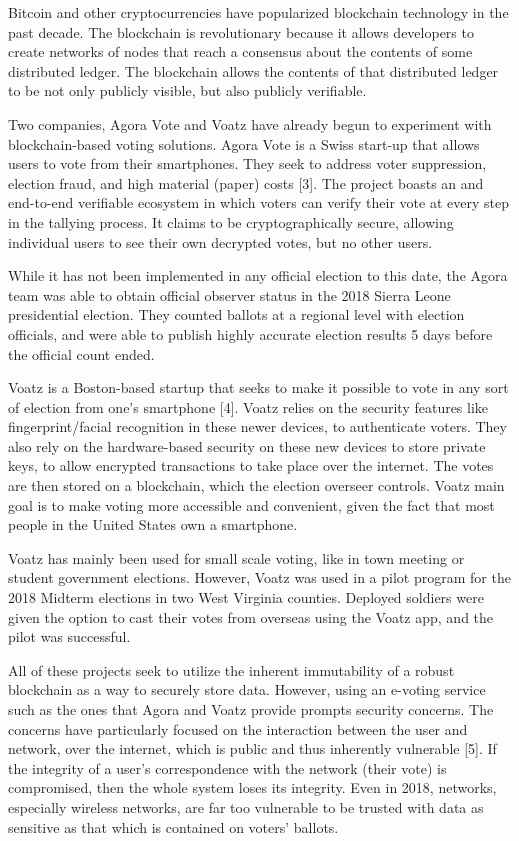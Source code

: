 \documentclass[conference]{IEEEtran}
\begin{document}
Bitcoin and other cryptocurrencies have popularized blockchain technology in the past decade. The blockchain is revolutionary because it allows developers to create networks of nodes that reach a consensus about the contents of some distributed ledger. The blockchain allows the contents of that distributed ledger to be not only publicly visible, but also publicly verifiable.

Two companies, Agora Vote and Voatz have already begun to experiment with blockchain-based voting solutions. Agora Vote is a Swiss start-up that allows users to vote from their smartphones. They seek to address voter suppression, election fraud, and high material (paper) costs [3]. The project boasts an and end-to-end verifiable ecosystem in which voters can verify their vote at every step in the tallying process. It claims to be cryptographically secure, allowing individual users to see their own decrypted votes, but no other users. 

While it has not been implemented in any official election to this date, the Agora team was able to obtain official observer status in the 2018 Sierra Leone presidential election. They counted ballots at a regional level with election officials, and were able to publish highly accurate election results 5 days before the official count ended.

Voatz is a Boston-based startup that seeks to make it possible to vote in any sort of election from one’s smartphone [4]. Voatz relies on the security features like fingerprint/facial recognition in these newer devices, to authenticate voters. They also rely on the hardware-based security on these new devices to store private keys, to allow encrypted transactions to take place over the internet. The votes are then stored on a blockchain, which the election overseer controls. Voatz main goal is to make voting more accessible and convenient, given the fact that most people in the United States own a smartphone.

Voatz has mainly been used for small scale voting, like in town meeting or student government elections. However, Voatz was used in a pilot program for the 2018 Midterm elections in two West Virginia counties. Deployed soldiers were given the option to cast their votes from overseas using the Voatz app, and the pilot was successful.

All of these projects seek to utilize the inherent immutability of a robust blockchain as a way to securely store data. However, using an e-voting service such as the ones that Agora and Voatz provide prompts security concerns. The concerns have particularly focused on the interaction between the user and network, over the internet, which is public and thus inherently vulnerable [5]. If the integrity of a user’s correspondence with the network (their vote) is compromised, then the whole system loses its integrity. Even in 2018, networks, especially wireless networks, are far too vulnerable to be trusted with data as sensitive as that which is contained on voters’ ballots.
\end{document}
